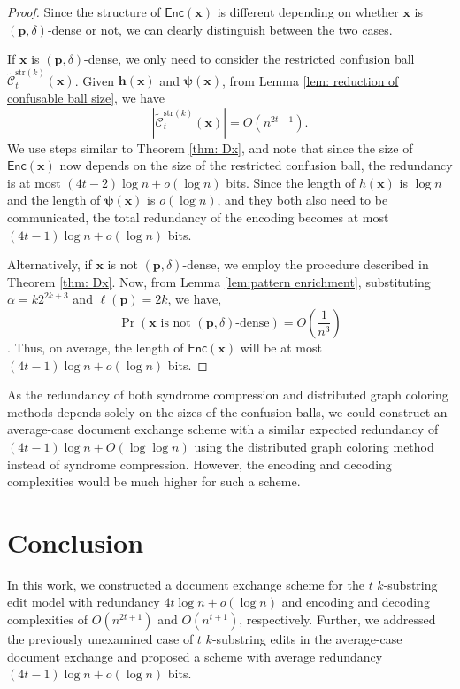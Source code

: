 \documentclass[onecolumn]{IEEEtran}
\newcommand{\bl}{n}
\newcommand{\numedits}{t}
\newcommand{\editsize}{k}
\newcommand{\resconfball}[3]{\tilde{\mathcal{C}}_{#1}^{#2}(#3)}
\newcommand{\length}[1]{{\ell}(#1)}
\newcommand{\encode}{\mathsf{Enc}}
\newcommand{\tksub}{$\numedits$ $\editsize$-substring\xspace}
\newcommand{\bfx}{{\mathbf{ x}}}
\newcommand{\vr}[1]{{\color{red} {\small [VR: #1]} }}
\begin{document}
\begin{proof}
Since the structure of $\encode(\mathbf{x})$ is different depending on whether $\mathbf{x}$ is $(\mathbf{p}, \delta)$-dense or not, we can clearly distinguish between the two cases. 

If $\mathbf{x}$ is $(\mathbf{p}, \delta)$-dense, we only need to consider the restricted confusion ball $\resconfball{\numedits}{\mathrm{str}(\editsize)}{\mathbf{x}}$. Given $\mathbf{h(\mathbf{x})}$ and $\mathbf{\psi(\mathbf{x})}$, from Lemma \ref{lem: reduction of confusable ball size}, we have $$|\resconfball{\numedits}{\mathrm{str}(\editsize)}{\mathbf{x}}| = O(\bl^{2\numedits-1}).$$  We use steps similar to Theorem {\ref{thm: Dx}}, and note that since the size of $\encode(\mathbf{x})$ now depends on the size of the restricted confusion ball, the redundancy is at most $(4\numedits-2)\log\bl + o(\log\bl)$ bits. Since the length of $h(\bfx)$ is $\log n$ and the length of $\mathbf{\psi(\mathbf{x})}$ is $o(\log n)$, and they both also need to be communicated, the total redundancy of the encoding becomes at most $(4\numedits-1)\log\bl + o(\log\bl)$ bits.

Alternatively, if $\bfx$ is not $(\mathbf{p}, \delta)$-dense, we employ the procedure described in Theorem \ref{thm: Dx}. Now, from Lemma \ref{lem:pattern enrichment}, substituting $\alpha = k2^{2k+3}$ and $\length{\mathbf{p}} = 2k$, we have, $$\Pr(\mathbf{x} \text{ is not } (\mathbf{p}, \delta)\text{-dense}) = O\left(\frac{1}{n^{3}}\right)$$. Thus, on average, the length of $\encode(\mathbf{x})$ will be at most $(4\numedits-1)\log\bl + o(\log\bl)$ bits.
\end{proof}

    As the redundancy of both syndrome compression and distributed graph coloring methods depends solely on the sizes of the confusion balls, we could construct an average-case document exchange scheme with a similar expected redundancy of $(4\numedits-1)\log\bl+O(\log\log\bl)$ using the distributed graph coloring method instead of syndrome compression. However, the encoding and decoding complexities would be much higher for such a scheme.%


\section{Conclusion}
In this work, we constructed a document exchange scheme for the \tksub edit model with redundancy $4\numedits \log\bl + o(\log \bl)$ and encoding and decoding complexities of $O(n^{2\numedits+1})$ and $O(n^{\numedits+1})$, respectively. Further, we addressed the previously unexamined case of \tksub edits in the average-case document exchange and proposed a scheme with average redundancy $(4\numedits -1)\log\bl + o(\log \bl)$ bits. 
\end{document}
